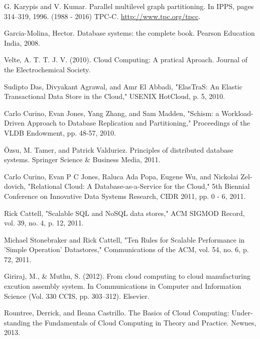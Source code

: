 
\begin{thebibliography}{9} \label{chapter:references}

	\begin{latin}
		 G. Karypis and V. Kumar. Parallel multilevel graph partitioning. In IPPS, pages 314–319, 1996.
		 (1988 - 2016) TPC-C. \href{http://www.tpc.org/tpcc}{http://www.tpc.org/tpcc}.
		
		 Garcia-Molina, Hector. Database systems: the complete book. Pearson Education India, 2008.
		
		 Velte, A. T. T. J. V. (2010). Cloud Computing: A pratical Aproach. Journal of the Electrochemical Society.
		
		 Sudipto Das, Divyakant Agrawal, and Amr El Abbadi, "ElasTraS: An Elastic Transactional Data Store in the Cloud," USENIX HotCloud, p. 5, 2010.
				
		 Carlo Curino, Evan Jones, Yang Zhang, and Sam Madden, "Schism: a Workload-Driven Approach to Database Replication and Partitioning," Proceedings of the VLDB Endowment, pp. 48-57, 2010.

		 Özsu, M. Tamer, and Patrick Valduriez. Principles of distributed database systems. Springer Science \& Business Media, 2011.
		
		 Carlo Curino, Evan P C Jones, Raluca Ada Popa, Eugene Wu, and Nickolai Zeldovich, "Relational Cloud: A Database-as-a-Service for the Cloud," 5th Biennial Conference on Innovative Data Systems Research, CIDR 2011, pp. 0 - 6, 2011.

		 Rick Cattell, "Scalable SQL and NoSQL data stores," ACM SIGMOD Record, vol. 39, no. 4, p. 12, 2011.

		 Michael Stonebraker and Rick Cattell, "Ten Rules for Scalable Performance in 'Simple Operation' Datastores," Communications of the ACM, vol. 54, no. 6, p. 72, 2011.

		 Giriraj, M., \& Muthu, S. (2012). From cloud computing to cloud manufacturing excution assembly system. In Communications in Computer and Information Science (Vol. 330 CCIS, pp. 303–312). Elsevier.
		
		 Rountree, Derrick, and Ileana Castrillo. The Basics of Cloud Computing: Understanding the Fundamentals of Cloud Computing in Theory and Practice. Newnes, 2013. 


\end{latin}
\end{thebibliography}
